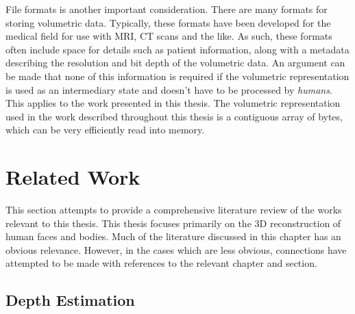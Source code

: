 File formats is another important consideration. There are many
formats for storing volumetric data. Typically, these formats have
been developed for the medical field for use with MRI, CT scans and
the like. As such, these formats often include space for details such
as patient information, along with a metadata describing the
resolution and bit depth of the volumetric data. An argument can be
made that none of this information is required if the volumetric
representation is used as an intermediary state and doesn't have to be
processed by \textit{humans}. This applies to the work presented in
this thesis. The volumetric representation used in the work described
throughout this thesis is a contiguous array of bytes, which can be
very efficiently read into memory.


\section{Related Work}



This section attempts to provide a comprehensive literature review of
the works relevant to this thesis. This thesis focuses primarily on
the 3D reconstruction of human faces and bodies. Much of the
literature discussed in this chapter has an obvious
relevance. However, in the cases which are less obvious, connections
have attempted to be made with references to the relevant chapter
and section.


\subsection{Depth Estimation}

